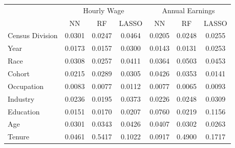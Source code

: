 \begin{tabular}{lccc|ccc}
\hline\hline
 & \multicolumn{3}{c|}{Hourly Wage} & \multicolumn{3}{c}{Annual Earnings} \\
 & NN & RF & LASSO & NN & RF & LASSO \\
\hline
Census Division&0.0301&0.0247&0.0464&0.0205&0.0248&0.0255\\
Year&0.0173&0.0157&0.0300&0.0143&0.0131&0.0253\\
Race&0.0308&0.0257&0.0411&0.0364&0.0503&0.0453\\
Cohort&0.0215&0.0289&0.0305&0.0426&0.0353&0.0141\\
Occupation&0.0083&0.0077&0.0112&0.0077&0.0065&0.0093\\
Industry&0.0236&0.0195&0.0373&0.0226&0.0248&0.0309\\
Education&0.0151&0.0170&0.0207&0.0760&0.0219&0.1156\\
Age&0.0301&0.0343&0.0426&0.0407&0.0302&0.0263\\
Tenure&0.0461&0.5417&0.1022&0.0917&0.4900&0.1717\\
\hline\hline
\end{tabular}
